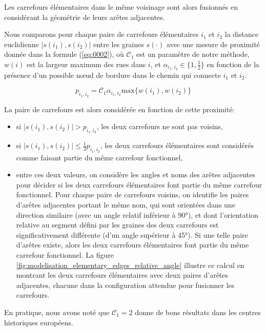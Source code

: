Les carrefours élémentaires dans le même voisinage sont alors fusionnés en considérant la géométrie de leurs arêtes adjacentes.

Nous comparons pour chaque paire de carrefours élémentaires $i_1$ et $i_2$ la distance euclidienne 
$|s(i_1), s(i_2)|$ entre les graines $s(\cdot)$ avec une mesure de proximité donnée dans la formule (\ref{eq:0002}), où $\mathcal{C}_1$ est un paramètre de notre méthode, $w(i)$ est la largeur maximum des rues dans $i$, et $\alpha_{i_1, i_2} \in \{ 1, \frac{1}{2} \}$ en fonction de la présence d'un possible nœud de bordure dans le chemin qui connecte $i_1$ et $i_2$.

\begin{equation}
 p_{i_1, i_2} = \mathcal{C}_1 \alpha_{i_1, i_2} \mathrm{max} \{ w(i_1), w(i_2) \}
 \label{eq:0002}
\end{equation}

La paire de carrefours est alors considérée en fonction de cette proximité:
\begin{itemize}
    \item si $|s(i_1), s(i_2)| > p_{i_1, i_2}$, les deux carrefours ne sont pas voisins,
    \item si $|s(i_1), s(i_2)| \leq \frac{1}{2} p_{i_1, i_2}$, les deux carrefours élémentaires sont considérés comme faisant partie du même carrefour fonctionnel,
    \item entre ces deux valeurs, on considère les angles et noms des arêtes adjacentes pour décider si les deux carrefours élémentaires font partie du même carrefour fonctionnel. Pour chaque paire de carrefours voisins, on identifie les paires d'arêtes adjacentes portant le même nom, qui sont orientées dans une direction similaire (avec un angle relatif inférieur à 90°), et dont l'orientation relative au segment défini par les graines des deux carrefours est significativement différente (d'un angle supérieur à 45°). Si une telle paire d'arêtes existe, alors les deux carrefours élémentaires font partie du même carrefour fonctionnel. La figure \ref{fig:modelisation_elementary_edges_relative_angle} illustre ce calcul en montrant les deux carrefours élémentaires avec deux paires d'arêtes adjacentes, chacune dans la configuration attendue pour fusionner les carrefours.
\end{itemize}

\newpar{}

En pratique, nous avons noté que $\mathcal{C}_1=2$  donne de bons résultats dans les centres historiques européens.

